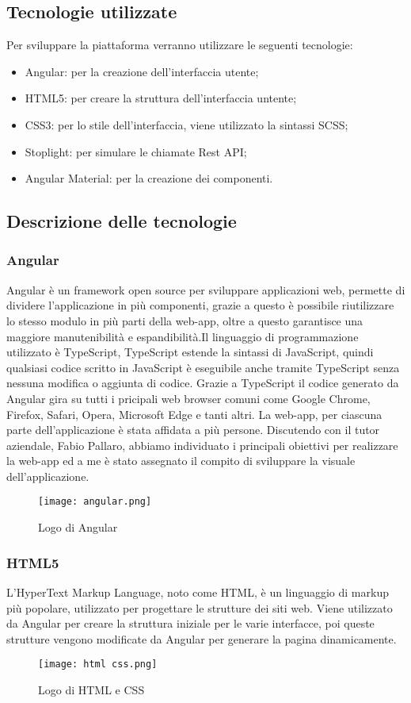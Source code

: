 \subsection{Tecnologie utilizzate}
Per sviluppare la piattaforma verranno utilizzare le seguenti tecnologie:
\begin{itemize}
    \item Angular: per la creazione dell'interfaccia utente;
    \item HTML5: per creare la struttura dell'interfaccia untente;
    \item CSS3: per lo stile dell'interfaccia, viene utilizzato la sintassi SCSS;
    \item Stoplight: per simulare le chiamate Rest API;
    \item Angular Material: per la creazione dei componenti.
\end{itemize}
\subsection{Descrizione delle tecnologie}
\subsubsection{Angular}
Angular è un framework open source per sviluppare applicazioni web, permette di dividere l'applicazione in più componenti, grazie a questo è possibile riutilizzare lo stesso modulo in più parti della web-app, oltre a questo garantisce una maggiore manutenibilità e espandibilità.Il linguaggio di programmazione utilizzato è TypeScript, TypeScript estende la sintassi di JavaScript, quindi qualsiasi codice scritto in JavaScript è eseguibile anche tramite TypeScript senza nessuna modifica o aggiunta di codice. Grazie a TypeScript il codice generato da Angular gira su tutti i pricipali web browser comuni come Google Chrome, Firefox, Safari, Opera, Microsoft Edge e tanti altri. La web-app, per ciascuna parte dell'applicazione è stata affidata a più persone. Discutendo con il tutor aziendale, Fabio Pallaro, abbiamo individuato i principali obiettivi per realizzare la web-app ed a me è stato assegnato il compito di sviluppare la visuale dell'applicazione. 
\begin{figure}[H]
    \centering
    \texttt{[image: angular.png]}
    \caption{Logo di Angular}
\end{figure}
\subsubsection{HTML5}
L'HyperText Markup Language, noto come HTML, è un linguaggio di markup più popolare, utilizzato per progettare le strutture dei siti web. Viene utilizzato da Angular per creare la struttura iniziale per le varie interfacce, poi queste strutture vengono modificate da Angular per generare la pagina dinamicamente. 
\begin{figure}[H]
    \centering
    \texttt{[image: html css.png]}
    \caption{Logo di HTML e CSS}
\end{figure}

